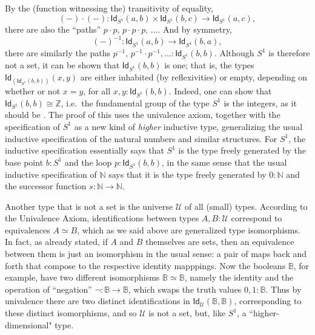 \documentclass[11pt]{article}
\newcommand{\B}{\ensuremath{\mathbb{B}}}
\newcommand{\N}{\ensuremath{\mathbb{N}}}
\newcommand{\Id}{\mathsf{Id}}
\newcommand{\id}[1]{\Id_{#1}}
\newcommand{\U}{\ensuremath{\mathcal{U}}}
\theoremstyle{remark}
\theoremstyle{definition}
\begin{document}
By the (function witnessing the) transitivity of equality, 
\[
(-)\cdot(-) : \id{S^1}(a,b) \times \id{S^1}(b,c)\to \id{S^1}(a,c),
\]
 there are also the ``paths'' $p\cdot p,\, p\cdot p\cdot p,\, \ldots$.   And by symmetry,
 \[
 (-)^{-1}:\id{S^1}(a,b) \to \id{S^1}(b,a),
 \]
 there are similarly the paths $p^{-1},\, p^{-1}\cdot p^{-1}, \ldots :\id{S^1}(b,b)$.  Although $S^1$ is therefore not a set, it can be shown that $\id{S^1}(b,b)$ is one; that is, the types $\id{\left(\id{S^1}(b,b)\right)}(x,y)$ are either inhabited (by reflexivities) or empty, depending on whether or not $x=y$, for all $x,y : \id{S^1}(b,b)$.  Indeed, one can show that $\id{S^1}(b,b) \cong \mathbb{Z}$, i.e.\ the fundamental group of the type $S^1$ is the integers, as it should be \cite{LS-Circ}.  
The proof of this uses the univalence axiom, together with the specification of $S^1$ as a new kind of \emph{higher} inductive type, generalizing the usual inductive specification of the natural numbers and similar structures.  For $S^1$, the inductive specification essentially says that $S^1$ is the type freely generated by the base point $b:S^1$ and the loop $p:\id{S^1}(b,b)$, in the same sense that the usual inductive specification of $\N$ says that it is the type freely generated by $0:\N$ and the successor function $s:\N\to\N$.  
  
Another type that is not a set is the universe $\U$ of all (small) types.  According to the Univalence Axiom, identifications between types $A,B:\U$ correspond to equivalences $A\simeq B$, which as we said above are generalized type isomorphisms.  In fact, as already stated, if $A$ and $B$ themselves are sets, then an equivalence between them is just an isomorphism in the usual sense: a pair of maps back and forth that compose to the respective identity mapppings.  Now the booleans $\B$, for example, have two different isomorphisms $\B\simeq \B$, namely the identity and the operation of ``negation'' $\neg:\B\to\B$, which swaps the truth values $0,1:\B$.  Thus by univalence there are two distinct identifications in $\id{\U}(\B,\B)$, corresponding to these distinct isomorphisms, and so $\U$ is not a set, but, like $S^1$, a ``higher-dimensional" type.  
 
\end{document}
